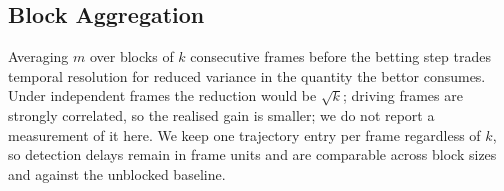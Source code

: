 \subsection{Block Aggregation}
\label{sec:method-blocking}

Averaging $m$ over blocks of $k$ consecutive frames before the betting step
trades temporal resolution for reduced variance in the quantity the bettor
consumes. Under independent frames the reduction would be $\sqrt{k}$;
driving frames are strongly correlated, so the realised gain is smaller;
we do not report a measurement of it here. We keep one
trajectory entry per frame regardless of $k$, so detection delays remain in
frame units and are comparable across block sizes and against the
unblocked baseline.
